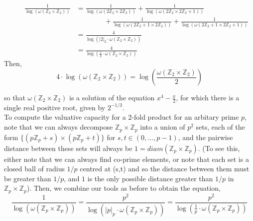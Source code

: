 \begin{align*}
\qquad  \frac{1}{\log(\omega(\mathbb{Z}_2 \times \mathbb{Z}_2))}& = \frac{1}{\log(\omega(2\mathbb{Z}_2 \times 2\mathbb{Z}_2))} + \frac{1}{\log(\omega(2\mathbb{Z}_2 \times 2\mathbb{Z}_2 +1))} \\
  &\qquad \qquad + \frac{1}{\log(\omega(2\mathbb{Z}_2+1 \times 2\mathbb{Z}_2))} + \frac{1}{\log(\omega(2\mathbb{Z}_2+1 \times 2\mathbb{Z}_2+1))}\\
& = \frac{4}{\log(\lvert 2 \rvert_2 \cdot \omega(\mathbb{Z}_2 \times \mathbb{Z}_2))} \\
&= \frac{4}{\log(\frac{1}{2} \cdot \omega(\mathbb{Z}_2 \times \mathbb{Z}_2))}
\end{align*}
Then,
\[4\cdot \log(\omega(\mathbb{Z}_2 \times \mathbb{Z}_2)) =\log(\frac{\omega(\mathbb{Z}_2 \times \mathbb{Z}_2)}{2}) \]



so that ${\omega(\mathbb{Z}_2 \times \mathbb{Z}_2)}$ is a solution of the equation $x^4 - \frac{x}{2}$, for which there is a single real positive root, given by $2^{-1/3}$.\\


To compute the valuative capacity for a $2$-fold product for an arbitary prime $p$, note that we can always decompose $\mathbb{Z}_p \times \mathbb{Z}_p$ into a union of $p^2$ sets, each of the form $\{(p\mathbb{Z}_p+s) \times (p\mathbb{Z}_p +t)\}$ for $s,t \in (0,\ldots, p-1)$, and the pairwise distance between these sets will always be $1 = diam(\mathbb{Z}_p \times \mathbb{Z}_p)$. (To see this, either note that we can always find co-prime elements, or note that each set is a closed ball of radius $1/p$ centred at (s,t) and so the distance between them must be greater than $1/p$, and $1$ is the only possible distance greater than $1/p$ in $\mathbb{Z}_p \times \mathbb{Z}_p$).  Then, we combine our tools as before to obtain the equation,\\

\[\frac{1}{\log(\omega(\mathbb{Z}_p \times \mathbb{Z}_p))} = \frac{p^2}{\log(\lvert p \rvert_p \cdot \omega(\mathbb{Z}_p \times \mathbb{Z}_p))} =  \frac{p^2}{\log(\frac{1}{p} \cdot \omega(\mathbb{Z}_p \times \mathbb{Z}_p))}    \]

